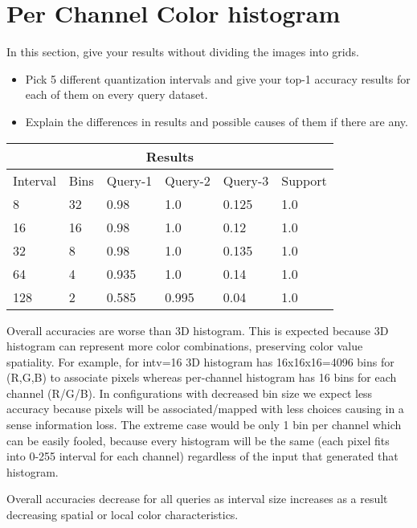 \documentclass[12pt]{article}
\begin{document}
\section{Per Channel Color histogram}
In this section, give your results without dividing the images into grids.

\begin{itemize}
\item Pick 5 different quantization intervals and give your top-1 accuracy results for each of them on every query dataset.
\item Explain the differences in results and possible causes of them if there are any.
\end{itemize}

\begin{tabular}{ |p{1.5cm}|p{1.5cm}||p{2cm}|p{2cm}|p{2cm}|p{2cm}|  }
    \hline
    \multicolumn{6}{|c|}{Results} \\
    \hline
    Interval & Bins & Query-1 & Query-2 & Query-3 & Support \\
    \hline
    8 & 32 & 0.98 & 1.0 & 0.125 & 1.0 \\
    \hline
    16 & 16 & 0.98 & 1.0 & 0.12 & 1.0 \\
    \hline
    32 & 8 & 0.98 & 1.0 & 0.135 & 1.0 \\
    \hline
    64 & 4 & 0.935 & 1.0 & 0.14 & 1.0 \\
    \hline
    128 & 2 & 0.585 & 0.995 & 0.04 & 1.0 \\
    \hline
\end{tabular}

\vspace{1cm}

Overall accuracies are worse than 3D histogram. This is expected because
3D histogram can represent more color combinations, preserving color value spatiality.
For example, for intv=16 3D histogram has 16x16x16=4096 bins for (R,G,B) to associate pixels
whereas per-channel histogram has 16 bins for each channel (R/G/B). In configurations with decreased bin size
we expect less accuracy because pixels will be associated/mapped with less choices
causing in a sense information loss. The extreme case would be only 1 bin per channel
which can be easily fooled, because every histogram will be the same 
(each pixel fits into 0-255 interval for each channel) regardless of the input 
that generated that histogram.

Overall accuracies decrease for all queries as interval size increases 
as a result decreasing spatial or local color characteristics.
\end{document}
